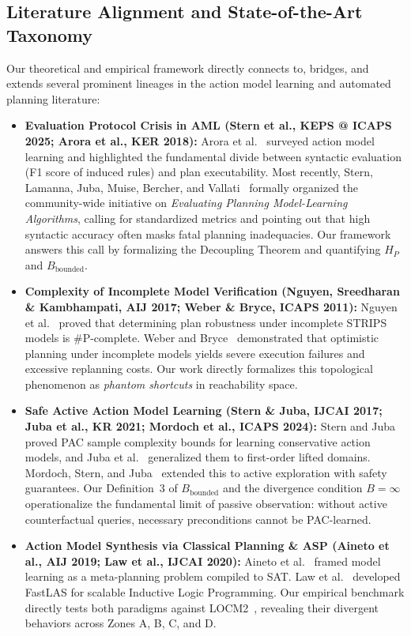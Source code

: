 \documentclass[11pt,a4paper]{article}
\theoremstyle{definition}
\begin{document}
\subsection{Literature Alignment and State-of-the-Art Taxonomy}
Our theoretical and empirical framework directly connects to, bridges, and extends several prominent lineages in the action model learning and automated planning literature:
\begin{itemize}[leftmargin=*]
    \item \textbf{Evaluation Protocol Crisis in AML (Stern et al., KEPS @ ICAPS 2025; Arora et al., KER 2018):} Arora et al.~\cite{arora2018review} surveyed action model learning and highlighted the fundamental divide between syntactic evaluation (F1 score of induced rules) and plan executability. Most recently, Stern, Lamanna, Juba, Muise, Bercher, and Vallati~\cite{stern2025evaluating} formally organized the community-wide initiative on \textit{Evaluating Planning Model-Learning Algorithms}, calling for standardized metrics and pointing out that high syntactic accuracy often masks fatal planning inadequacies. Our framework answers this call by formalizing the Decoupling Theorem and quantifying $H_P$ and $B_{\text{bounded}}$.
    \item \textbf{Complexity of Incomplete Model Verification (Nguyen, Sreedharan \& Kambhampati, AIJ 2017; Weber \& Bryce, ICAPS 2011):} Nguyen et al.~\cite{nguyen2017robust} proved that determining plan robustness under incomplete STRIPS models is \#P-complete. Weber and Bryce~\cite{weber2011planning} demonstrated that optimistic planning under incomplete models yields severe execution failures and excessive replanning costs. Our work directly formalizes this topological phenomenon as \textit{phantom shortcuts} in reachability space.
    \item \textbf{Safe Active Action Model Learning (Stern \& Juba, IJCAI 2017; Juba et al., KR 2021; Mordoch et al., ICAPS 2024):} Stern and Juba~\cite{stern2017efficient} proved PAC sample complexity bounds for learning conservative action models, and Juba et al.~\cite{juba2021safe} generalized them to first-order lifted domains. Mordoch, Stern, and Juba~\cite{mordoch2024safe} extended this to active exploration with safety guarantees. Our Definition~3 of $B_{\text{bounded}}$ and the divergence condition $B = \infty$ operationalize the fundamental limit of passive observation: without active counterfactual queries, necessary preconditions cannot be PAC-learned.
    \item \textbf{Action Model Synthesis via Classical Planning \& ASP (Aineto et al., AIJ 2019; Law et al., IJCAI 2020):} Aineto et al.~\cite{aineto2019learning} framed model learning as a meta-planning problem compiled to SAT. Law et al.~\cite{law2020fastlas} developed FastLAS for scalable Inductive Logic Programming. Our empirical benchmark directly tests both paradigms against LOCM2~\cite{cresswell2013locm2}, revealing their divergent behaviors across Zones A, B, C, and D.

\end{itemize}
\end{document}
